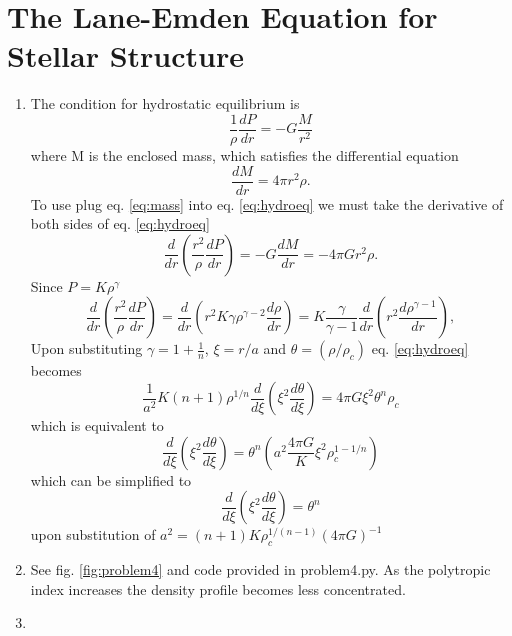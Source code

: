 \documentclass[11pt]{article}
\begin{document}
\section{The Lane-Emden Equation for Stellar Structure}
\label{sec:org868c2d1}
\begin{enumerate}[label=\alph*)]
   \item
       The condition for hydrostatic equilibrium is
       \begin{equation}\label{eq:hydroeq}
          \frac{1}{\rho} \frac{dP}{dr} = - G \frac{M}{r^{2}}
       \end{equation}
       where M is the enclosed mass, which satisfies the differential equation
       \begin{equation}\label{eq:mass}
          \frac{dM}{dr} = 4 \pi r^{2} \rho.
       \end{equation}
  To use plug eq. \ref{eq:mass} into eq. \ref{eq:hydroeq} we must take the derivative of both sides of eq. \ref{eq:hydroeq}
       \begin{equation}\label{eq:hydrod}
          \frac{d}{dr}\left( \frac{r^{2}}{\rho} \frac{dP}{dr} \right) = - G \frac{dM}{dr} = -4 \pi G r^{2} \rho.
       \end{equation}
       Since $P = K \rho^{\gamma}$
       \begin{equation}
           \frac{d}{dr}\left( \frac{r^{2}}{\rho} \frac{dP}{dr} \right)
           = \frac{d}{dr}\left(r^{2} K \gamma \rho^{\gamma-2} \frac{d \rho}{dr} \right)
           =K \frac{\gamma}{\gamma - 1} \frac{d}{dr}\left(r^{2} \frac{d \rho^{\gamma-1}}{dr} \right),
       \end{equation}
       Upon substituting $\gamma = 1 + \frac{1}{n}$, $\xi = r/a$ and $\theta = (\rho / \rho_{c})$ eq. \ref{eq:hydroeq} becomes
       \begin{equation}
          \frac{1}{a^2} K (n+1) \rho^{1/n} \frac{d}{d \xi}\left( \xi^2 \frac{d \theta}{d\xi} \right) = 4 \pi G \xi^{2} \theta^{n} \rho_{c}
       \end{equation}
       which is equivalent to
       \begin{equation}
          \frac{d}{d \xi}\left( \xi^2 \frac{d \theta}{d\xi} \right) = \theta^{n} \left( a^{2} \frac{4 \pi G}{K} \xi^{2} \rho_{c}^{1-1/n} \right)
       \end{equation}
       which can be simplified to
       \begin{equation}
          \frac{d}{d \xi}\left( \xi^2 \frac{d \theta}{d\xi} \right) = \theta^{n}
       \end{equation}
       upon substitution of $a^{2} = (n+1)K\rho_c^{1/(n-1)}(4 \pi G)^{-1}$
\item
       See fig. \ref{fig:problem4} and code provided in problem4.py. As the polytropic index increases the density profile becomes less concentrated.
\item


\end{enumerate}
\end{document}
